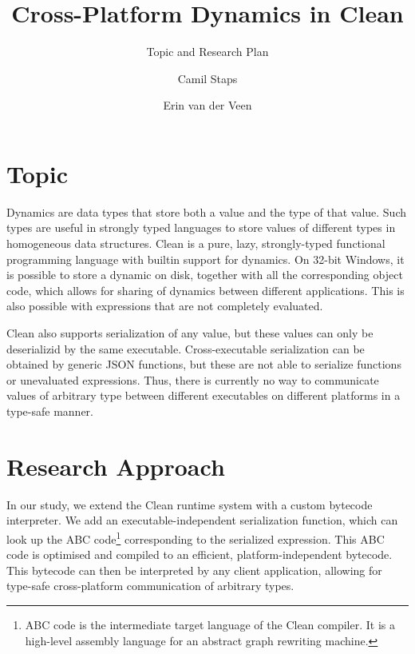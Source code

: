 \documentclass{scrartcl}
\title{Cross-Platform Dynamics in Clean}
\subtitle{Topic and Research Plan}
\author[1]{Camil Staps}
\author[1]{Erin van der Veen}
\affil[1]{Radboud University Nijmegen}
\begin{document}
\maketitle

\section{Topic}
Dynamics are data types that store both a value and the type of that value.
Such types are useful in strongly typed languages to store values of different types in homogeneous data structures.
Clean is a pure, lazy, strongly-typed functional programming language with builtin support for dynamics.
On 32-bit Windows, it is possible to store a dynamic on disk, together with all the corresponding object code,
	which allows for sharing of dynamics between different applications.
This is also possible with expressions that are not completely evaluated.

Clean also supports serialization of any value, but these values can only be deserializid by the same executable.
Cross-executable serialization can be obtained by generic JSON functions, but these are not able to serialize functions or unevaluated expressions.
Thus, there is currently no way to communicate values of arbitrary type between different executables on different platforms in a type-safe manner.

\section{Research Approach}
In our study, we extend the Clean runtime system with a custom bytecode interpreter.
We add an executable-independent serialization function,
	which can look up the ABC code\footnote{ABC code is the intermediate target language of the Clean compiler. It is a high-level assembly language for an abstract graph rewriting machine.} corresponding to the serialized expression.
This ABC code is optimised and compiled to an efficient, platform-independent bytecode.
This bytecode can then be interpreted by any client application, allowing for type-safe cross-platform communication of arbitrary types.
\end{document}
